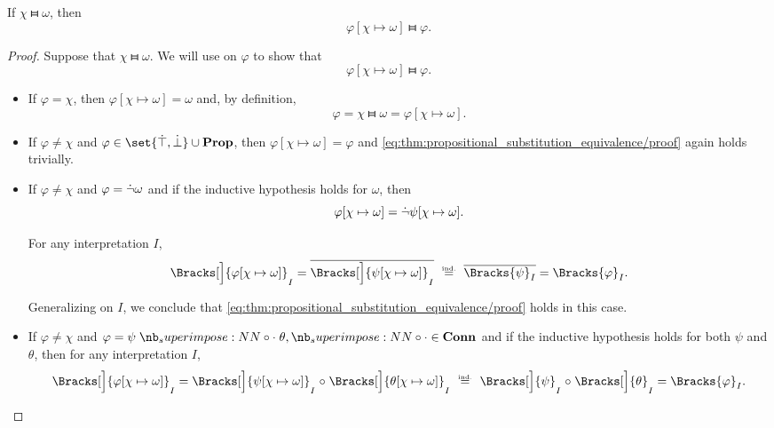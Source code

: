 \begin{proposition}\label{thm:propositional_substitution_equivalence}
  If \( \chi \gleichstark \omega \), then
  \begin{equation*}
    \varphi[\chi \mapsto \omega] \gleichstark \varphi.
  \end{equation*}
\end{proposition}
\begin{proof}
  Suppose that \( \chi \gleichstark \omega \). We will use  on \( \varphi \) to show that
  \begin{equation}\label{eq:thm:propositional_substitution_equivalence/proof}
    \varphi[\chi \mapsto \omega] \gleichstark \varphi.
  \end{equation}

  \begin{itemize}
    \item If \( \varphi = \chi \), then \( \varphi[\chi \mapsto \omega] = \omega \) and, by definition,
    \begin{equation*}
      \varphi = \chi \gleichstark \omega = \varphi[\chi \mapsto \omega].
    \end{equation*}

    \item If \( \varphi \neq \chi \) and \( \varphi \in \set{ \syntop, \synbot } \cup \op*{Prop} \), then \( \varphi[\chi \mapsto \omega] = \varphi \) and \eqref{eq:thm:propositional_substitution_equivalence/proof} again holds trivially.

    \item If \( \varphi \neq \chi \) and \( \varphi = \dot{\neg} \omega \) and if the inductive hypothesis holds for \( \omega \), then
    \begin{equation*}
      \varphi[\chi \mapsto \omega] = \dot{\neg} \psi[\chi \mapsto \omega].
    \end{equation*}

    For any interpretation \( I \),
    \begin{equation*}
      \Bracks[\Big]{ \varphi[\chi \mapsto \omega] }_I
      =
      \oline{\Bracks[\Big]{\psi[\chi \mapsto \omega] }_I}
      \reloset {\T{ind.}} =
      \oline{\Bracks{\psi}_I}
      =
      \Bracks{\varphi}_I.
    \end{equation*}

    Generalizing on \( I \), we conclude that \eqref{eq:thm:propositional_substitution_equivalence/proof} holds in this case.

    \item If \( \varphi \neq \chi \) and \( \varphi = \psi \syncirc \theta, {\syncirc} \in \op*{Conn} \) and if the inductive hypothesis holds for both \( \psi \) and \( \theta \), then for any interpretation \( I \),
    \begin{equation*}
      \Bracks[\Big]{ \varphi[\chi \mapsto \omega] }_I
      =
      \Bracks[\Big]{ \psi[\chi \mapsto \omega] }_I \relcirc \Bracks[\Big]{ \theta[\chi \mapsto \omega] }_I
      \reloset {\T{ind.}} =
      \Bracks[\Big]{\psi}_I \relcirc \Bracks[\Big]{\theta}_I
      =
      \Bracks{\varphi}_I.
    \end{equation*}


\end{itemize}
\end{proof}
